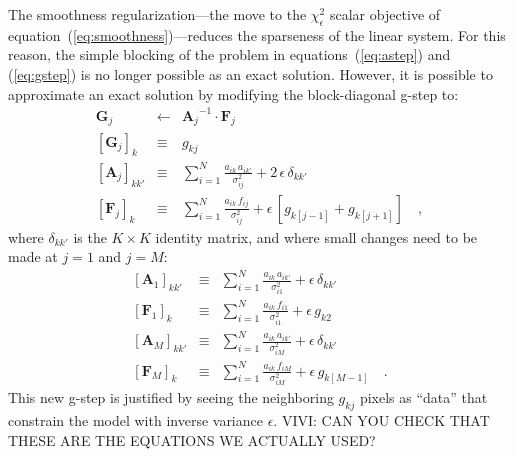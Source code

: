 \documentclass[12pt,preprint]{aastex}
\newcommand{\equationname}{equation}
\newcommand{\tv}[1]{\boldsymbol{#1}}
\newcommand{\inverse}[1]{{#1}^{-1}}
\begin{document}
The smoothness regularization---the move to the $\chi^2_{\epsilon}$
scalar objective of \equationname~(\ref{eq:smoothness})---reduces the
sparseness of the linear system.  For this reason, the simple blocking
of the problem in {\equationname}s~(\ref{eq:astep}) and
(\ref{eq:gstep}) is no longer possible as an exact solution.  However,
it is possible to approximate an exact solution by modifying the
block-diagonal g-step to:
\begin{eqnarray}\label{eq:gstep_smooth}\displaystyle
\tv{G}_j & \gets & \inverse{\tv{A}_j}\cdot\tv{F}_j \nonumber\\
\left[\tv{G}_j\right]_k & \equiv & g_{kj} \nonumber\\
\left[\tv{A}_j\right]_{kk'} & \equiv & \sum_{i=1}^{N} \frac{a_{ik}\,a_{ik'}}{\sigma_{ij}^2} + 2\,\epsilon\,\delta_{kk'} \nonumber\\
\left[\tv{F}_j\right]_k     & \equiv & \sum_{i=1}^{N} \frac{a_{ik}\,f_{i j}}{\sigma_{ij}^2} + \epsilon\,[g_{k[j-1]} + g_{k[j+1]}]
\quad ,
\end{eqnarray}
where $\delta_{kk'}$ is the $K\times K$ identity matrix, and where
small changes need to be made at $j=1$ and $j=M$:
\begin{eqnarray}\label{eq:gstep_tweaks}\displaystyle
\left[\tv{A}_1\right]_{kk'} & \equiv & \sum_{i=1}^{N} \frac{a_{ik}\,a_{ik'}}{\sigma_{i1}^2} + \epsilon\,\delta_{kk'} \nonumber\\
\left[\tv{F}_1\right]_k     & \equiv & \sum_{i=1}^{N} \frac{a_{ik}\,f_{i 1}}{\sigma_{i1}^2} + \epsilon\,g_{k2} \nonumber\\
\left[\tv{A}_M\right]_{kk'} & \equiv & \sum_{i=1}^{N} \frac{a_{ik}\,a_{ik'}}{\sigma_{iM}^2} + \epsilon\,\delta_{kk'} \nonumber\\
\left[\tv{F}_M\right]_k     & \equiv & \sum_{i=1}^{N} \frac{a_{ik}\,f_{i M}}{\sigma_{iM}^2} + \epsilon\,g_{k[M-1]}
\quad .
\end{eqnarray}
This new g-step is justified by seeing the neighboring $g_{kj}$ pixels
as ``data'' that constrain the model with inverse variance $\epsilon$.
VIVI: CAN YOU CHECK THAT THESE ARE THE EQUATIONS WE ACTUALLY USED?
\end{document}
